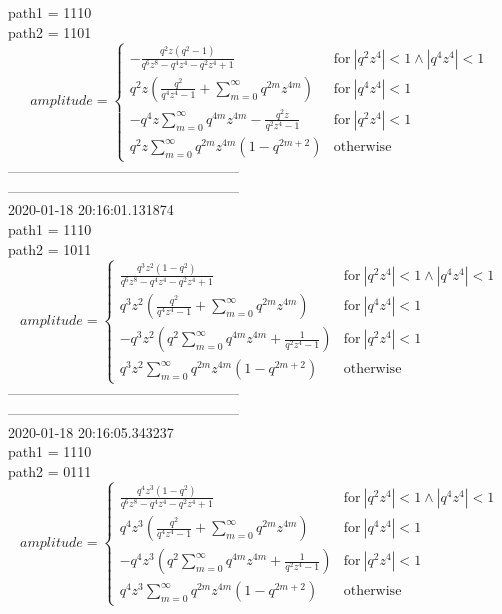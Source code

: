 \documentclass{jsreport}
\begin{document}
path1 = 1110\\
path2 = 1101\\
$$amplitude = \begin{cases} - \frac{q^{2} z \left(q^{2} - 1\right)}{q^{6} z^{8} - q^{4} z^{4} - q^{2} z^{4} + 1} & \text{for}\: \left|{q^{2} z^{4}}\right| < 1 \wedge \left|{q^{4} z^{4}}\right| < 1 \\q^{2} z \left(\frac{q^{2}}{q^{4} z^{4} - 1} + \sum_{m=0}^{\infty} q^{2 m} z^{4 m}\right) & \text{for}\: \left|{q^{4} z^{4}}\right| < 1 \\- q^{4} z \sum_{m=0}^{\infty} q^{4 m} z^{4 m} - \frac{q^{2} z}{q^{2} z^{4} - 1} & \text{for}\: \left|{q^{2} z^{4}}\right| < 1 \\q^{2} z \sum_{m=0}^{\infty} q^{2 m} z^{4 m} \left(1 - q^{2 m + 2}\right) & \text{otherwise} \end{cases}$$
--------------------------------------------------\\
--------------------------------------------------\\
2020-01-18 20:16:01.131874\\
path1 = 1110\\
path2 = 1011\\
$$amplitude = \begin{cases} \frac{q^{3} z^{2} \left(1 - q^{2}\right)}{q^{6} z^{8} - q^{4} z^{4} - q^{2} z^{4} + 1} & \text{for}\: \left|{q^{2} z^{4}}\right| < 1 \wedge \left|{q^{4} z^{4}}\right| < 1 \\q^{3} z^{2} \left(\frac{q^{2}}{q^{4} z^{4} - 1} + \sum_{m=0}^{\infty} q^{2 m} z^{4 m}\right) & \text{for}\: \left|{q^{4} z^{4}}\right| < 1 \\- q^{3} z^{2} \left(q^{2} \sum_{m=0}^{\infty} q^{4 m} z^{4 m} + \frac{1}{q^{2} z^{4} - 1}\right) & \text{for}\: \left|{q^{2} z^{4}}\right| < 1 \\q^{3} z^{2} \sum_{m=0}^{\infty} q^{2 m} z^{4 m} \left(1 - q^{2 m + 2}\right) & \text{otherwise} \end{cases}$$
--------------------------------------------------\\
--------------------------------------------------\\
2020-01-18 20:16:05.343237\\
path1 = 1110\\
path2 = 0111\\
$$amplitude = \begin{cases} \frac{q^{4} z^{3} \left(1 - q^{2}\right)}{q^{6} z^{8} - q^{4} z^{4} - q^{2} z^{4} + 1} & \text{for}\: \left|{q^{2} z^{4}}\right| < 1 \wedge \left|{q^{4} z^{4}}\right| < 1 \\q^{4} z^{3} \left(\frac{q^{2}}{q^{4} z^{4} - 1} + \sum_{m=0}^{\infty} q^{2 m} z^{4 m}\right) & \text{for}\: \left|{q^{4} z^{4}}\right| < 1 \\- q^{4} z^{3} \left(q^{2} \sum_{m=0}^{\infty} q^{4 m} z^{4 m} + \frac{1}{q^{2} z^{4} - 1}\right) & \text{for}\: \left|{q^{2} z^{4}}\right| < 1 \\q^{4} z^{3} \sum_{m=0}^{\infty} q^{2 m} z^{4 m} \left(1 - q^{2 m + 2}\right) & \text{otherwise} \end{cases}$$
\end{document}
